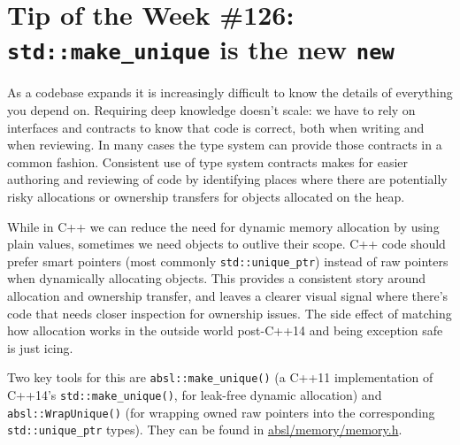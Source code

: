 
\chapter{Tip of the Week \#126: \texorpdfstring{\texttt{std::make_unique}}{} is the new \texorpdfstring{\texttt{new}}{}}\label{ch:tip-of-the-week-126}

As a codebase expands it is increasingly difficult to know the details of everything you depend on. Requiring deep knowledge doesn’t scale: we have to rely on interfaces and contracts to know that code is correct, both when writing and when reviewing. In many cases the type system can provide those contracts in a common fashion. Consistent use of type system contracts makes for easier authoring and reviewing of code by identifying places where there are potentially risky allocations or ownership transfers for objects allocated on the heap.

While in C++ we can reduce the need for dynamic memory allocation by using plain values, sometimes we need objects to outlive their scope. C++ code should prefer smart pointers (most commonly \texttt{std::unique_ptr}) instead of raw pointers when dynamically allocating objects. This provides a consistent story around allocation and ownership transfer, and leaves a clearer visual signal where there’s code that needs closer inspection for ownership issues. The side effect of matching how allocation works in the outside world post-C++14 and being exception safe is just icing.

Two key tools for this are \texttt{absl::make_unique()} (a C++11 implementation of C++14’s \texttt{std::make_unique()}, for leak-free dynamic allocation) and \texttt{absl::WrapUnique()} (for wrapping owned raw pointers into the corresponding \texttt{std::unique_ptr} types). They can be found in \href{https://github.com/abseil/abseil-cpp/blob/master/absl/memory/memory.h}{absl/memory/memory.h}.

